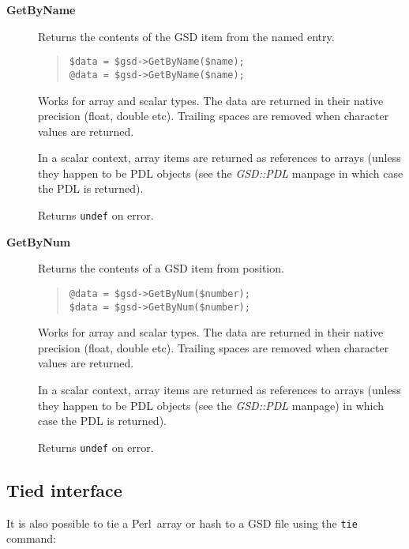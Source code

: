 \documentclass[twoside,11pt]{article}
\newenvironment{myquote}{\begin{quote}\begin{small}}{\end{small}\end{quote}}
\newcommand{\perl}{\xref{\textsf{Perl}}{sun193}{}}
\newcommand{\xref}[3]{#1}
\renewcommand{\_}{\texttt{\symbol{95}}}
\begin{document}
\begin{description}
\item[\textbf{GetByName}] \mbox{}

Returns the contents of the GSD item from the named entry.

\begin{myquote}
\begin{verbatim}
$data = $gsd->GetByName($name);
@data = $gsd->GetByName($name);
\end{verbatim}
\end{myquote} %

Works for array and scalar types. The data are returned in their native
precision (float, double etc).  Trailing spaces are removed when character
values are returned.

In a scalar context, array items are returned as references to arrays (unless
they happen to be PDL objects (see the \emph{GSD::PDL} manpage in which case
the PDL is returned).

Returns \texttt{undef} on error.

\item[\textbf{GetByNum}] \mbox{}

Returns the contents of a GSD item from position.

\begin{myquote}
\begin{verbatim}
@data = $gsd->GetByNum($number);
$data = $gsd->GetByNum($number);
\end{verbatim}
\end{myquote} %

Works for array and scalar types. The data are returned in their
native precision (float, double etc).  Trailing spaces are removed
when character values are returned.

In a scalar context, array items are returned as references to
arrays (unless they happen to be PDL objects (see the \emph{GSD::PDL} manpage)
in which case the PDL is returned).

Returns \texttt{undef} on error.

\end{description}

\subsection{Tied interface\label{TIED_INTERFACE}}

It is also possible to tie a \perl\ array or hash to a GSD file
using the \texttt{tie} command:
\end{document}
